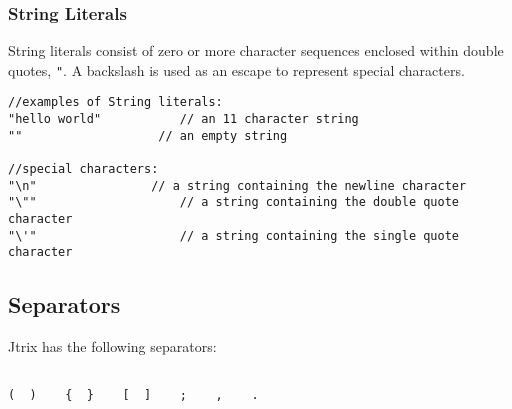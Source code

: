 \documentclass[12pt]{report}
\begin{document}
\subsubsection{String Literals}
String literals consist of zero or more character sequences enclosed within double quotes, \texttt{"}.  A backslash is used as an escape to represent special characters.
\begin{lstlisting}
//examples of String literals:
"hello world"			// an 11 character string
""                   // an empty string

//special characters:
"\n"  				// a string containing the newline character
"\""					// a string containing the double quote character
"\'"					// a string containing the single quote character
\end{lstlisting}
\subsection{Separators}
Jtrix has the following separators:

\begin{lstlisting}

(  )    {  }    [  ]    ;    ,    .
\end{lstlisting}
\end{document}

